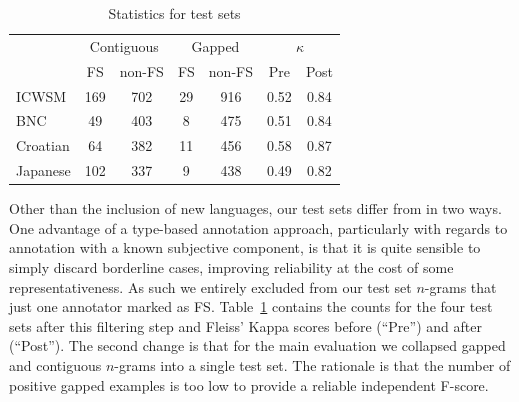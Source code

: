 \documentclass[11pt,letterpaper]{article}
\newcommand{\z}{\phantom{0}}
\newcommand{\tabref}[2][]{Table#1~\ref{#2}\xspace}
\newcommand{\secref}[2][]{Section#1~\ref{#2}\xspace}
\begin{document}
\begin{table}[!bt]
 
 \begin{center}
	 \begin{tabular}{@{}lc@{\,\,\,}cc@{\,\,\,}cc@{\,\,\,}c@{}}

       \toprule
       & \multicolumn{2}{c}{Contiguous} & \multicolumn{2}{c}{Gapped} & \multicolumn{2}{c}{$\kappa$} \\ %
       \cmidrule(lr){2-3}\cmidrule(lr){4-5}\cmidrule(lr){6-7}
			& FS & non-FS & FS & non-FS & Pre & Post \\
			 \midrule
			ICWSM    & 169  & 702 & 29 & 916 &0.52 &0.84 \\
			BNC      & \z49 & 403 & \z8& 475 &0.51 &0.84 \\
			Croatian & \z64 & 382 & 11 & 456 & 0.58 &0.87 \\
			Japanese & 102  & 337 & \z9 & 438 & 0.49 &0.82\\
       \bottomrule
 \end{tabular}
  \caption{ Statistics for test sets }
	 \label{tab:stats}

 \end{center}

 \end{table}

Other than the inclusion of new languages, our test sets differ from  in two ways. One advantage of a type-based annotation approach, particularly with regards to annotation with a known subjective component, is that it is quite sensible to simply discard borderline cases, improving reliability at the cost of some representativeness. As such we entirely excluded from our test set $n$-grams that just one annotator marked as FS. \tabref{tab:stats} contains the counts for the four test sets after this filtering step and Fleiss' Kappa scores before (``Pre'') and after (``Post'').  The second change is that for the main evaluation we collapsed gapped and contiguous $n$-grams into a single test set. The rationale is that the number of positive gapped examples is too low to provide a reliable independent F-score.

\end{document}
